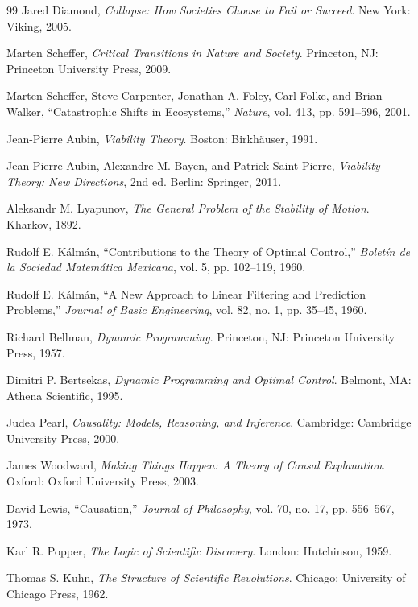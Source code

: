 \documentclass[11pt,oneside]{book}
\theoremstyle{definition}
\theoremstyle{remark}
\begin{document}
\begin{thebibliography}{99}
 Jared Diamond, \emph{Collapse: How Societies Choose to Fail or Succeed}. New York: Viking, 2005.

 Marten Scheffer, \emph{Critical Transitions in Nature and Society}. Princeton, NJ: Princeton
  University Press, 2009.

 Marten Scheffer, Steve Carpenter, Jonathan A. Foley, Carl Folke, and Brian Walker,
  ``Catastrophic Shifts in Ecosystems,'' \emph{Nature}, vol. 413, pp. 591--596, 2001.

 Jean-Pierre Aubin, \emph{Viability Theory}. Boston: Birkh\"auser, 1991.

 Jean-Pierre Aubin, Alexandre M. Bayen, and Patrick Saint-Pierre, \emph{Viability Theory: New
  Directions}, 2nd ed. Berlin: Springer, 2011.

 Aleksandr M. Lyapunov, \emph{The General Problem of the Stability of Motion}. Kharkov, 1892.

 Rudolf E. K\'alm\'an, ``Contributions to the Theory of Optimal Control,'' \emph{Bolet\'in de la
  Sociedad Matem\'atica Mexicana}, vol. 5, pp. 102--119, 1960.

 Rudolf E. K\'alm\'an, ``A New Approach to Linear Filtering and Prediction Problems,''
  \emph{Journal of Basic Engineering}, vol. 82, no. 1, pp. 35--45, 1960.

 Richard Bellman, \emph{Dynamic Programming}. Princeton, NJ: Princeton University Press, 1957.

 Dimitri P. Bertsekas, \emph{Dynamic Programming and Optimal Control}. Belmont, MA: Athena
  Scientific, 1995.

 Judea Pearl, \emph{Causality: Models, Reasoning, and Inference}. Cambridge: Cambridge University
  Press, 2000.

 James Woodward, \emph{Making Things Happen: A Theory of Causal Explanation}. Oxford: Oxford
  University Press, 2003.

 David Lewis, ``Causation,'' \emph{Journal of Philosophy}, vol. 70, no. 17, pp. 556--567, 1973.

 Karl R. Popper, \emph{The Logic of Scientific Discovery}. London: Hutchinson, 1959.

 Thomas S. Kuhn, \emph{The Structure of Scientific Revolutions}. Chicago: University of Chicago
  Press, 1962.


\end{thebibliography}
\end{document}
